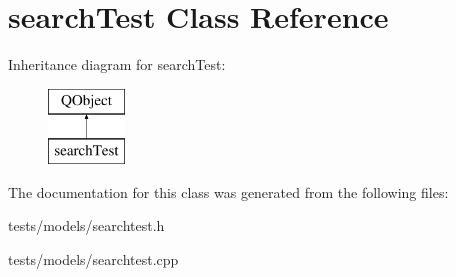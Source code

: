 \hypertarget{classsearchTest}{}\section{search\+Test Class Reference}
\label{classsearchTest}
Inheritance diagram for search\+Test\+:\begin{figure}[H]
\begin{center}
\leavevmode
\includegraphics[height=2.000000cm]{d7/d51/classsearchTest}
\end{center}
\end{figure}


The documentation for this class was generated from the following files\+:\begin{DoxyCompactItemize}
\item 
tests/models/searchtest.\+h\item 
tests/models/searchtest.\+cpp\end{DoxyCompactItemize}
